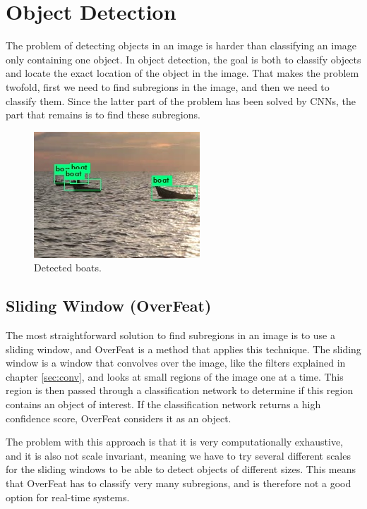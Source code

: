 


\chapter{Object Detection}
The problem of detecting objects in an image is harder than classifying an image only containing one object. In object detection, the goal is both to classify objects and locate the exact location of the object in the image. That makes the problem twofold, first we need to find subregions in the image, and then we need to classify them. Since the latter part of the problem has been solved by CNNs, the part that remains is to find these subregions. 

\begin{figure}[h!]
    \centering
    \includegraphics[scale=0.8]{images/predictions2.jpg}
    \caption{Detected boats.}
    \label{fig:boat_detection}
\end{figure}


\section{Sliding Window (OverFeat)}
The most straightforward solution to find subregions in an image is to use a sliding window, and OverFeat \citep{Sermanet2013} is a method that applies this technique. The sliding window is a window that convolves over the image, like the filters explained in chapter \ref{sec:conv}, and looks at small regions of the image one at a time. This region is then passed through a classification network to determine if this region contains an object of interest. If the classification network returns a high confidence score, OverFeat considers it as an object. 

\vspace{3mm}

The problem with this approach is that it is very computationally exhaustive, and it is also not scale invariant, meaning we have to try several different scales for the sliding windows to be able to detect objects of different sizes. This means that OverFeat has to classify very many subregions, and is therefore not a good option for real-time systems.


